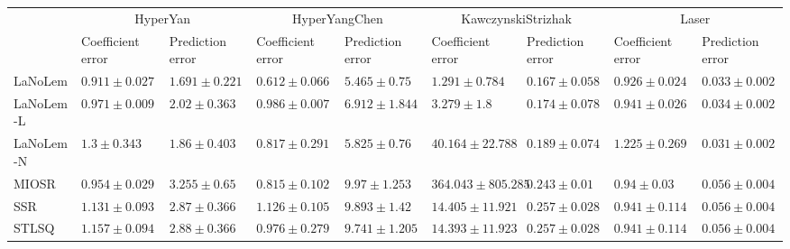 \begin{table*}
{\begin{tabular}{lllllllll}
 & \multicolumn{2}{c}{HyperYan} & \multicolumn{2}{c}{HyperYangChen} & \multicolumn{2}{c}{KawczynskiStrizhak} & \multicolumn{2}{c}{Laser} \\
 & Coefficient error & Prediction error & Coefficient error & Prediction error & Coefficient error & Prediction error & Coefficient error & Prediction error \\
\midrule
LaNoLem & $\mathbf{0.911}\pm 0.027$ & $\mathbf{1.691}\pm 0.221$ & $\mathbf{0.612}\pm 0.066$ & $\mathbf{5.465}\pm 0.75$ & $\mathbf{1.291}\pm 0.784$ & $\mathbf{0.167}\pm 0.058$ & $\mathbf{0.926}\pm 0.024$ & $0.033\pm 0.002$ \\
LaNoLem-L & $0.971\pm 0.009$ & $2.02\pm 0.363$ & $0.986\pm 0.007$ & $6.912\pm 1.844$ & $3.279\pm 1.8$ & $0.174\pm 0.078$ & $0.941\pm 0.026$ & $0.034\pm 0.002$ \\
LaNoLem-N & $1.3\pm 0.343$ & $1.86\pm 0.403$ & $0.817\pm 0.291$ & $5.825\pm 0.76$ & $40.164\pm 22.788$ & $0.189\pm 0.074$ & $1.225\pm 0.269$ & $\mathbf{0.031}\pm 0.002$ \\
MIOSR & $0.954\pm 0.029$ & $3.255\pm 0.65$ & $0.815\pm 0.102$ & $9.97\pm 1.253$ & $364.043\pm 805.285$ & $0.243\pm 0.01$ & $0.94\pm 0.03$ & $0.056\pm 0.004$ \\
SSR & $1.131\pm 0.093$ & $2.87\pm 0.366$ & $1.126\pm 0.105$ & $9.893\pm 1.42$ & $14.405\pm 11.921$ & $0.257\pm 0.028$ & $0.941\pm 0.114$ & $0.056\pm 0.004$ \\
STLSQ & $1.157\pm 0.094$ & $2.88\pm 0.366$ & $0.976\pm 0.279$ & $9.741\pm 1.205$ & $14.393\pm 11.923$ & $0.257\pm 0.028$ & $0.941\pm 0.114$ & $0.056\pm 0.004$ \\

\midrule


\end{tabular}}
\end{table*}
